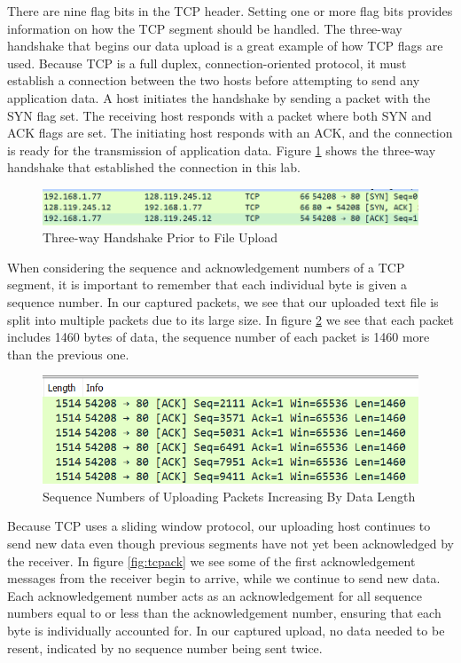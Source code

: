 \documentclass[10pt]{IEEEtran}
\begin{document}
 There are nine flag bits in the TCP header. Setting one or more flag bits provides information on how the TCP segment should be handled. The three-way handshake that begins our data upload is a great example of how TCP flags are used. Because TCP is a full duplex, connection-oriented protocol, it must establish a connection between the two hosts before attempting to send any application data. A host initiates the handshake by sending a packet with the SYN flag set. The receiving host responds with a packet where both SYN and ACK flags are set. The initiating host responds with an ACK, and the connection is ready for the transmission of application data. Figure \ref{fig:threewayhandshake} shows the three-way handshake that established the connection in this lab.\\
 
    \begin{figure}[h!]
	\includegraphics[width=\linewidth]{threewayhandshake.png}
	\caption{Three-way Handshake Prior to File Upload}
	\label{fig:threewayhandshake}
\end{figure}
 
 When considering the sequence and acknowledgement numbers of a TCP segment, it is important to remember that each individual byte is given a sequence number. In our captured packets, we see that our uploaded text file is split into multiple packets due to its large size. In figure \ref{fig:tcpsequence} we see that each packet includes 1460 bytes of data, the sequence number of each packet is 1460 more than the previous one.\\
 
\begin{figure}[h!]
	\includegraphics[width=\linewidth]{tcpsequence.png}
	\caption{Sequence Numbers of Uploading Packets Increasing By Data Length}
	\label{fig:tcpsequence}
	\end{figure}
	
 Because TCP uses a sliding window protocol, our uploading host continues to send new data even though previous segments have not yet been acknowledged by the receiver. In figure \ref{fig:tcpack} we see some of the first acknowledgement messages from the receiver begin to arrive, while we continue to send new data. Each acknowledgement number acts as an acknowledgement for all sequence numbers equal to or less than the acknowledgement number, ensuring that each byte is individually accounted for. In our captured upload, no data needed to be resent, indicated by no sequence number being sent twice.\\
 
\end{document}
